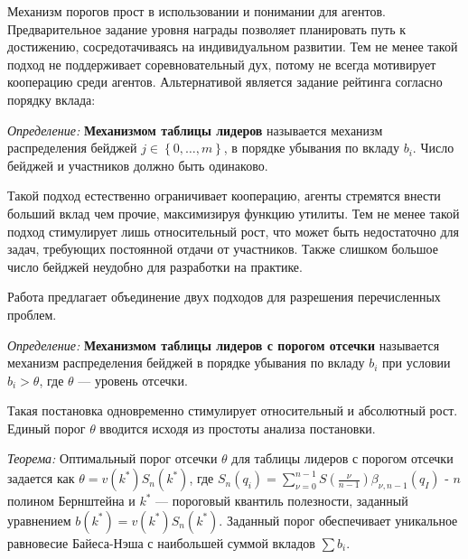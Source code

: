Механизм порогов прост в использовании и понимании для агентов. Предварительное задание уровня награды позволяет
планировать путь к достижению, сосредотачиваясь на индивидуальном развитии. Тем не менее 
такой подход не поддерживает соревновательный дух, потому не всегда мотивирует кооперацию среди агентов.
Альтернативой является задание рейтинга согласно порядку вклада:

\textit{Определение:} \textbf{Механизмом таблицы лидеров} называется механизм распределения бейджей  $j \in \left\{0,\dots,m\right\}$,
в порядке убывания по вкладу $b_i$. Число бейджей и участников должно быть одинаково.

Такой подход естественно ограничивает кооперацию, агенты стремятся внести больший вклад чем прочие, максимизируя функцию утилиты.
Тем не менее такой подход стимулирует лишь относительный рост, что может быть недостаточно для задач, требующих постоянной отдачи от участников. 
Также слишком большое число бейджей неудобно для разработки на практике. 

Работа \cite{Easley2013} предлагает объединение двух подходов для разрешения перечисленных проблем.

\textit{Определение:} \textbf{Механизмом таблицы лидеров с порогом отсечки} называется механизм распределения бейджей
в порядке убывания по вкладу $b_i$ при условии $b_i > \theta$, где $\theta$ --- уровень отсечки.

Такая постановка одновременно стимулирует относительный и абсолютный рост. Единый порог $\theta$ вводится исходя из простоты
анализа постановки. 

\textit{Теорема:} Оптимальный порог отсечки $\theta$ для таблицы лидеров с порогом отсечки задается как $\theta=v(k^*) S_n(k^*)$,
где $S_n(q_i) = \sum_{\nu=0}^{n-1} S\left(\frac{\nu}{n-1}\right) \beta_{\nu,n-1} (q_I)$ - $n$ полином Бернштейна и $k^*$ --- пороговый 
квантиль полезности, заданный уравнением $b(k^*) = v(k^*) S_n(k^*)$. Заданный порог обеспечивает уникальное равновесие Байеса-Нэша
с наибольшей суммой вкладов $\sum b_i$.